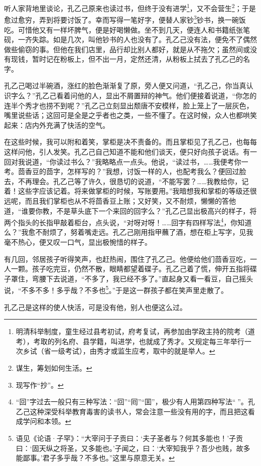 \documentclass[12pt,UTF8]{ctexbook}
\begin{document}
听人家背地里谈论，孔乙己原来也读过书，但终于没有进学\footnote{明清科举制度，童生经过县考初试，府考复试，再参加由学政主持的院考（道考），考取的列名府、县学籍，叫进学，也就成了秀才。又规定每三年举行一次乡试（省一级考试），由秀才或监生应考，取中的就是举人。}，又不会营生\footnote{谋生，筹划如何生活。}；于是愈过愈穷，弄到将要讨饭了。幸而写得一笔好字，便替人家钞\footnote{现写作“抄”。}钞书，换一碗饭吃。可惜他又有一样坏脾气，便是好喝懒做。坐不到几天，便连人和书籍纸张笔砚，一齐失踪。如是几次，叫他钞书的人也没有了。孔乙己没有法，便免不了偶然做些偷窃的事。但他在我们店里，品行却比别人都好，就是从不拖欠；虽然间或没有现钱，暂时记在粉板上，但不出一月，定然还清，从粉板上拭去了孔乙己的名字。

孔乙己喝过半碗酒，涨红的脸色渐渐复了原，旁人便又问道，“孔乙己，你当真认识字么？”孔乙己看着问他的人，显出不屑置辩的神气。他们便接着说道，“你怎的连半个秀才也捞不到呢？”孔乙己立刻显出颓唐不安模样，脸上笼上了一层灰色，嘴里说些话；这回可是全是之乎者也之类，一些不懂了。在这时候，众人也都哄笑起来：店内外充满了快活的空气。

在这些时候，我可以附和着笑，掌柜是决不责备的。而且掌柜见了孔乙己，也每每这样问他，引人发笑。孔乙己自己知道不能和他们谈天，便只好向孩子说话。有一回对我说道，“你读过书么？”我略略点一点头。他说，“读过书，……我便考你一考。茴香豆的茴字，怎样写的？”我想，讨饭一样的人，也配考我么？便回过脸去，不再理会。孔乙己等了许久，很恳切的说道，“不能写罢？……我教给你，记着！这些字应该记着。将来做掌柜的时候，写账要用。”我暗想我和掌柜的等级还很远呢，而且我们掌柜也从不将茴香豆上账；又好笑，又不耐烦，懒懒的答他道，“谁要你教，不是草头底下一个来回的回字么？”孔乙己显出极高兴的样子，将两个指头的长指甲敲着柜台，点头说，“对呀对呀！……回字有四样写法\footnote{“回”字过去一般只有三种写法：“回”“囘”“囬”，极少有人用第四种写法“𡇌”。孔乙己这种深受科举教育毒害的读书人，常会注意一些没有用的字，而且把这看成学问和本领。}，你知道么？”我愈不耐烦了，努着嘴走远。孔乙己刚用指甲蘸了酒，想在柜上写字，见我毫不热心，便又叹一口气，显出极惋惜的样子。

有几回，邻居孩子听得笑声，也赶热闹，围住了孔乙己。他便给他们茴香豆吃，一人一颗。孩子吃完豆，仍然不散，眼睛都望着碟子。孔乙己着了慌，伸开五指将碟子罩住，弯腰下去说道，“不多了，我已经不多了。”直起身又看一看豆，自己摇头说，“不多不多！多乎哉？不多也\footnote{语见《论语·子罕》：“大宰问于子贡曰：‘夫子圣者与？何其多能也！’子贡曰：‘固天纵之将圣，又多能也。’子闻之，曰：‘大宰知我乎？吾少也贱，故多能鄙事。’君子多乎哉？不多也。”这里与原意无关。}。”于是这一群孩子都在笑声里走散了。

孔乙己是这样的使人快活，可是没有他，别人也便这么过。
\end{document}
